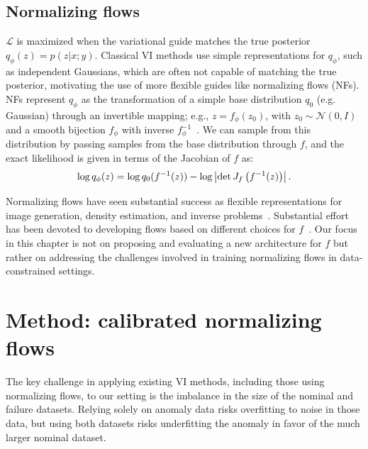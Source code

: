 \subsection{Normalizing flows}

$\mathcal{L}$ is maximized when the variational guide matches the true posterior $q_\phi(z) = p(z | x; y)$. Classical VI methods use simple representations for $q_\phi$, such as independent Gaussians, which are often not capable of matching the true posterior, motivating the use of more flexible guides like normalizing flows (NFs). NFs represent $q_\phi$ as the transformation of a simple base distribution $q_0$ (e.g. Gaussian) through an invertible mapping; e.g., $z = f_\phi(z_0)$, with $z_0 \sim \mathcal{N}(0, I)$ and a smooth bijection $f_\phi$ with inverse $f_\phi^{-1}$~\cite{tabakDensityEstimationDual2010, rezendeVariationalInferenceNormalizing2015}. We can sample from this distribution by passing samples from the base distribution through $f$, and the exact likelihood is given in terms of the Jacobian of $f$ as:
\begin{equation}
    \log q_\phi(z) = \log q_0(f^{-1}(z)) - \log \left| \det J_f\left( f^{-1}(z) \right) \right|.
\end{equation}

Normalizing flows have seen substantial success as flexible representations for image generation, density estimation, and inverse problems~\cite{asimInvertibleGenerativeModels2020}. Substantial effort has been devoted to developing flows based on different choices for $f$~\cite{papamakariosNormalizingFlowsProbabilistic2021,grathwohlFFJORDFreeFormContinuous2018,onkenOTFlowFastAccurate2021,huangNeuralAutoregressiveFlows2018,durkanNeuralSplineFlows2019}. Our focus in this chapter is not on proposing and evaluating a new architecture for $f$ but rather on addressing the challenges involved in training normalizing flows in data-constrained settings.

\section{Method: calibrated normalizing flows}\label{ch:icml:methodology}

The key challenge in applying existing VI methods, including those using normalizing flows, to our setting is the imbalance in the size of the nominal and failure datasets. Relying solely on anomaly data risks overfitting to noise in those data, but using both datasets risks underfitting the anomaly in favor of the much larger nominal dataset.

